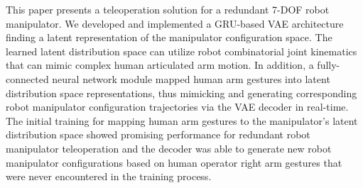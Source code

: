\vspace{-1.5mm}
This paper presents a teleoperation solution for a redundant 7-DOF robot manipulator. We developed and implemented a GRU-based VAE architecture finding a latent representation of the manipulator configuration space. The learned latent distribution space can utilize robot combinatorial joint kinematics that can mimic complex human articulated arm motion. In addition, a fully-connected neural network module mapped human arm gestures into latent distribution space representations, thus mimicking and generating corresponding robot manipulator configuration trajectories via the VAE decoder in real-time. The initial training for mapping human arm gestures to the manipulator’s latent distribution space showed promising performance for redundant robot manipulator teleoperation and the decoder was able to generate new robot manipulator configurations based on human operator right arm gestures that were never encountered in the training process.
